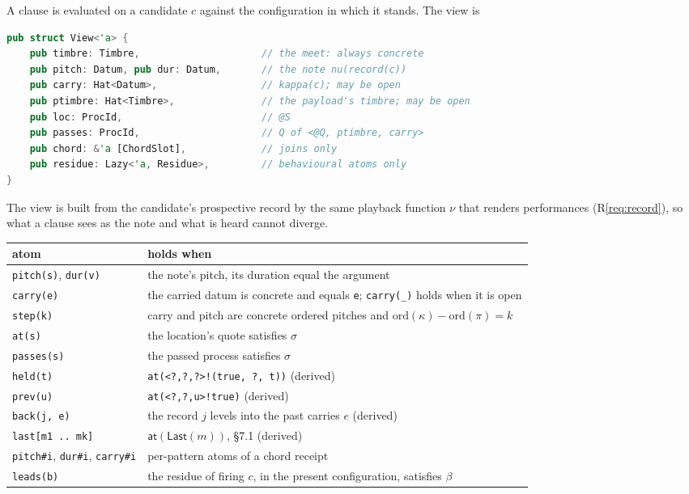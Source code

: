 \documentclass[11pt,a4paper]{article}
\theoremstyle{definition}
\theoremstyle{remark}
\newcommand{\atm}[1]{\mathsf{#1}}
\begin{document}
A clause is evaluated on a candidate $c$ against the configuration in which it
stands. The view is
\begin{lstlisting}[language=Rust]
pub struct View<'a> {
    pub timbre: Timbre,                     // the meet: always concrete
    pub pitch: Datum, pub dur: Datum,       // the note nu(record(c))
    pub carry: Hat<Datum>,                  // kappa(c); may be open
    pub ptimbre: Hat<Timbre>,               // the payload's timbre; may be open
    pub loc: ProcId,                        // @S
    pub passes: ProcId,                     // Q of <@Q, ptimbre, carry>
    pub chord: &'a [ChordSlot],             // joins only
    pub residue: Lazy<'a, Residue>,         // behavioural atoms only
}
\end{lstlisting}
\noindent The view is built from the candidate's prospective record by the
same playback function $\nu$ that renders performances (R\ref{req:record}), so
what a clause sees as the note and what is heard cannot diverge.

\begin{center}
\small
\begin{tabular}{@{}l>{\raggedright\arraybackslash}p{9.3cm}@{}}
\toprule
atom & holds when \\
\midrule
\texttt{pitch(s)}, \texttt{dur(v)} & the note's pitch, its duration equal the
  argument \\
\texttt{carry(e)} & the carried datum is concrete and equals \texttt{e};
  \texttt{carry(\_)} holds when it is open \\
\texttt{step(k)} & carry and pitch are concrete ordered pitches and
  $\mathrm{ord}(\kappa)-\mathrm{ord}(\pi)=k$ \\
\texttt{at(s)} & the location's quote satisfies $\sigma$ \\
\texttt{passes(s)} & the passed process satisfies $\sigma$ \\
\texttt{held(t)} & \texttt{at(<?,?,?>!(true, ?, t))} (derived) \\
\texttt{prev(u)} & \texttt{at(<?,?,u>!true)} (derived) \\
\texttt{back(j, e)} & the record $j$ levels into the past carries $e$ (derived) \\
\texttt{last[m1 .. mk]} & $\atm{at}(\mathsf{Last}(m))$, \S7.1 (derived) \\
\texttt{pitch\#i}, \texttt{dur\#i}, \texttt{carry\#i} & per-pattern atoms of a
  chord receipt \\
\texttt{leads(b)} & the residue of firing $c$, in the present configuration,
  satisfies $\beta$ \\
\bottomrule
\end{tabular}
\end{center}
\end{document}
